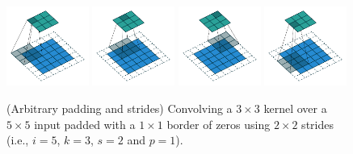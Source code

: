 \begin{figure}[p]
    \centering
    \includegraphics[width=0.24\textwidth]{pdf/padding_strides_00.pdf}
    \includegraphics[width=0.24\textwidth]{pdf/padding_strides_01.pdf}
    \includegraphics[width=0.24\textwidth]{pdf/padding_strides_02.pdf}
    \includegraphics[width=0.24\textwidth]{pdf/padding_strides_03.pdf}
    \caption{\label{fig:padding_strides} (Arbitrary padding and strides)
        Convolving a $3 \times 3$ kernel over a $5 \times 5$ input padded with
        a $1 \times 1$ border of zeros using $2 \times 2$ strides (i.e.,
        $i = 5$, $k = 3$, $s = 2$ and $p = 1$).}
\end{figure}

